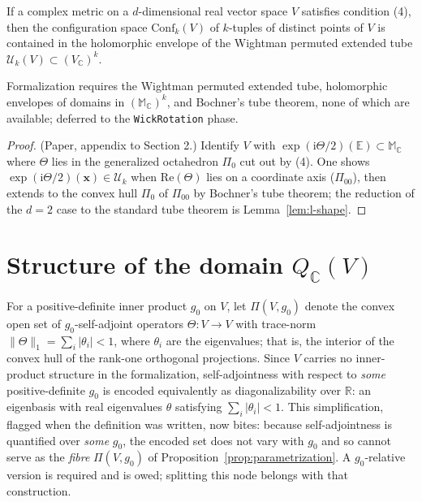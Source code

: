 \begin{proposition}
  \label{prop:conf-envelope}
  \notready
  If a complex metric on a $d$-dimensional real vector space $V$ satisfies
  condition (4), then the configuration space $\mathrm{Conf}_k(V)$ of
  $k$-tuples of distinct points of $V$ is contained in the holomorphic
  envelope of the Wightman permuted extended tube
  $\mathcal U_k(V) \subset (V_{\mathbb C})^k$.

  Formalization requires the Wightman permuted extended tube, holomorphic
  envelopes of domains in $(\mathbb M_{\mathbb C})^k$, and Bochner's tube
  theorem, none of which are available; deferred to the
  \texttt{WickRotation} phase.
\end{proposition}

\begin{proof}
  (Paper, appendix to Section 2.) Identify $V$ with
  $\exp(\mathrm i \Theta/2)(\mathbb E) \subset \mathbb M_{\mathbb C}$ where
  $\Theta$ lies in the generalized octahedron $\Pi_0$ cut out by (4). One
  shows $\exp(\mathrm i \Theta/2)(\mathbf x) \in \mathcal U_k$ when
  $\mathrm{Re}(\Theta)$ lies on a coordinate axis ($\Pi_{00}$), then extends
  to the convex hull $\Pi_0$ of $\Pi_{00}$ by Bochner's tube theorem; the
  reduction of the $d = 2$ case to the standard tube theorem is
  Lemma~\ref{lem:l-shape}.
\end{proof}

\section{Structure of the domain $Q_{\mathbb C}(V)$}

\begin{definition}
  \label{def:trace-norm-fiber}
  \leanok
  For a positive-definite inner product $g_0$ on $V$, let $\Pi(V, g_0)$
  denote the convex open set of $g_0$-self-adjoint operators
  $\Theta \colon V \to V$ with trace-norm
  $\|\Theta\|_1 = \sum_i |\theta_i| < 1$, where $\theta_i$ are the
  eigenvalues; that is, the interior of the convex hull of the rank-one
  orthogonal projections. Since $V$ carries no inner-product structure in
  the formalization, self-adjointness with respect to \emph{some}
  positive-definite $g_0$ is encoded equivalently as diagonalizability over
  $\mathbb R$: an eigenbasis with real eigenvalues $\theta$ satisfying
  $\sum_i |\theta_i| < 1$.
  This simplification, flagged when the definition was written, now bites: because
  self-adjointness is quantified over \emph{some} $g_0$, the encoded set does not vary
  with $g_0$ and so cannot serve as the \emph{fibre} $\Pi(V,g_0)$ of
  Proposition~\ref{prop:parametrization}. A $g_0$-relative version is required and is
  owed; splitting this node belongs with that construction.
\end{definition}

